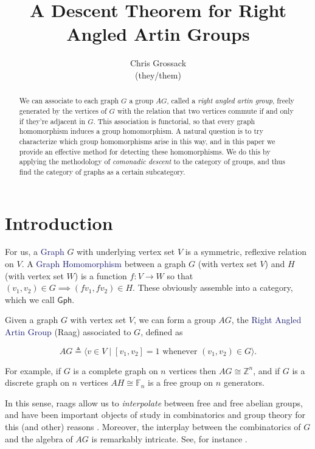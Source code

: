 \documentclass[12pt]{article}
\author{Chris Grossack\\ (they/them)}
\title{A Descent Theorem for Right Angled Artin Groups}
\theoremstyle{definition}
\theoremstyle{theorem}
\newcommand{\teq}{\triangleq}
\newcommand*{\important}[1]{\textcolor{MidnightBlue}{#1}}
\begin{document}
\maketitle

\begin{abstract}
  We can associate to each graph $G$ a group $AG$, called a
  \emph{right angled artin group}, freely generated by the vertices
  of $G$ with the relation that two vertices commute if and only if 
  they're adjacent in $G$. This association is functorial, so that 
  every graph homomorphism induces a group homomorphism. 
  A natural question is to try characterize which group homomorphisms
  arise in this way, and in this paper we provide an effective 
  method for detecting these homomorphisms. We do this by applying the
  methodology of \emph{comonadic descent} to the category of groups,
  and thus find the category of graphs as a certain subcategory.
\end{abstract}

\section{Introduction}
\label{intro}
    For us, a \important{Graph} $G$ with underlying vertex set $V$ is a 
    symmetric, reflexive relation on $V$. A \important{Graph Homomorphism} between 
    a graph $G$ (with vertex set $V$) and $H$ (with vertex set $W$) is a 
    function $f : V \to W$ so that $(v_1, v_2) \in G \implies (f v_1, f v_2) \in H$.
    These obviously assemble into a category, which we call $\mathsf{Gph}$.

    Given a graph $G$ with vertex set $V$, we can form a group $AG$, the 
    \important{Right Angled Artin Group} (Raag) associated to $G$, defined as

    \[ AG \teq \langle v \in V \mid [v_1, v_2] = 1 \text{ whenever } (v_1,v_2) \in G \rangle .\]

    For example, if $G$ is a complete graph on $n$ vertices then 
    $AG \cong \mathbb{Z}^n$, and if $G$ is a discrete graph on $n$ vertices
    $AH \cong \mathbb{F}_n$ is a free group on $n$ generators. 

    In this sense, raags allow us to \emph{interpolate} between free and free
    abelian groups, and have been important objects of study in combinatorics
    and group theory for this (and other) reasons . 
    Moreover, the interplay between the combinatorics of $G$ and the 
    algebra of $AG$ is remarkably intricate. See, for instance 
    .
\end{document}

